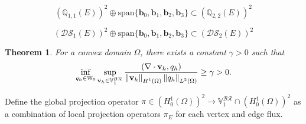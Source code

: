 \documentclass[usenames,dvipsnames,letterpaper,landscape,final]{slides}
\newtheorem*{thm*}{Theorem}
\theoremstyle{definition}
\begin{document}
\begin{myslide}
\begin{equation*}
		  (\mathbb{Q}_{1,1} (E))^2 \oplus \text{span}\{\mathbf{b}_0, \mathbf{b}_1, \mathbf{b}_2, \mathbf{b}_3 \} \subset (\mathbb{Q}_{2,2}(E))^2
\end{equation*}


\begin{equation*}\label{eq:br}
		  (\mathcal{DS}_1(E))^2 \oplus \text{span}\{\mathbf{b}_0, \mathbf{b}_1, \mathbf{b}_2, \mathbf{b}_3\} \subset (\mathcal{DS}_2(E))^2
\end{equation*}

\begin{thm*}
		  For a convex domain $\Omega$, there exists a constant $\gamma > 0$ such that
		  \begin{equation}
					 \inf_{q_h \in \mathbb{W}_0} \sup_{\mathbf{v}_h \in \mathbb{V}_1^{\mathcal{BR}}} \frac{(\nabla \cdot \mathbf{v}_h, q_h)}{\left\lVert\mathbf{v}_h\right\rVert_{H^1(\Omega)}\left\lVert q_h\right\rVert_{L^2(\Omega)}} \geq \gamma >0.
		  \end{equation}
\end{thm*}

 Define the global projection operator $\pi \in (H^1_0(\Omega))^2 \rightarrow \mathbb{V}_1^{\mathcal{BR}} \cap (H^1_0(\Omega))^2$ as a combination of local projection operators $\pi_E$ for each vertex and edge flux.

\end{myslide}
\end{document}
